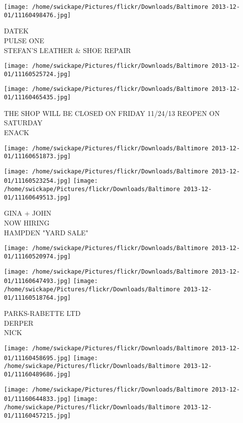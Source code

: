 \documentclass[10pt,letterpaper]{article}
\begin{document}
\vspace{0.25in}
\texttt{[image: /home/swickape/Pictures/flickr/Downloads/Baltimore 2013-12-01/11160498476.jpg]}

DATEK\\
PULSE ONE\\
STEFAN'S LEATHER \& SHOE REPAIR
\pagebreak

\texttt{[image: /home/swickape/Pictures/flickr/Downloads/Baltimore 2013-12-01/11160525724.jpg]}

\vspace{0.25in}
\texttt{[image: /home/swickape/Pictures/flickr/Downloads/Baltimore 2013-12-01/11160465435.jpg]}

THE SHOP WILL BE CLOSED ON FRIDAY 11/24/13 REOPEN ON SATURDAY\\
ENACK
\pagebreak

\texttt{[image: /home/swickape/Pictures/flickr/Downloads/Baltimore 2013-12-01/11160651873.jpg]}

\vspace{0.25in}
\texttt{[image: /home/swickape/Pictures/flickr/Downloads/Baltimore 2013-12-01/11160523254.jpg]}
\texttt{[image: /home/swickape/Pictures/flickr/Downloads/Baltimore 2013-12-01/11160649513.jpg]}

GINA + JOHN\\
NOW HIRING\\
HAMPDEN "YARD SALE"
\pagebreak

\texttt{[image: /home/swickape/Pictures/flickr/Downloads/Baltimore 2013-12-01/11160520974.jpg]}

\vspace{0.25in}
\texttt{[image: /home/swickape/Pictures/flickr/Downloads/Baltimore 2013-12-01/11160647493.jpg]}
\texttt{[image: /home/swickape/Pictures/flickr/Downloads/Baltimore 2013-12-01/11160518764.jpg]}

PARKS{-}RABETTE LTD\\
DERPER\\
NICK
\pagebreak

\texttt{[image: /home/swickape/Pictures/flickr/Downloads/Baltimore 2013-12-01/11160458695.jpg]}
\texttt{[image: /home/swickape/Pictures/flickr/Downloads/Baltimore 2013-12-01/11160489686.jpg]}

\texttt{[image: /home/swickape/Pictures/flickr/Downloads/Baltimore 2013-12-01/11160644833.jpg]}
\texttt{[image: /home/swickape/Pictures/flickr/Downloads/Baltimore 2013-12-01/11160457215.jpg]}
\end{document}
